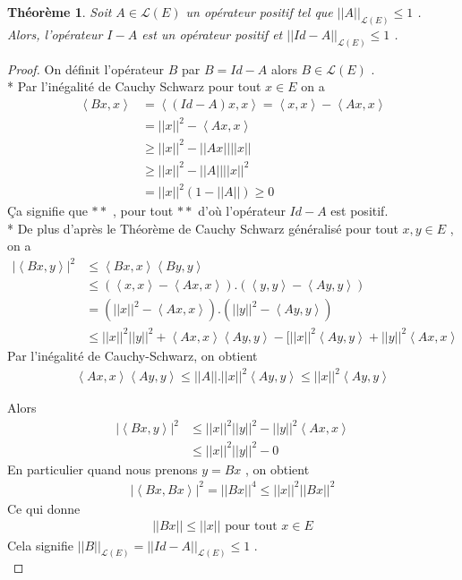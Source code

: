\documentclass{report}
\newtheorem{The}{Théorème}[subsection]
\begin{document}
{\begin{The} Soit $A \in \mathscr{L}(E)$ un opérateur positif tel que $||A||_{\mathscr{L}(E)} \le 1$ . Alors, l'opérateur $I - A$ est un opérateur positif et $||Id - A||_{\mathscr{L}(E)} \le 1$ .\\
\end{The}
\begin{proof}
On définit l'opérateur $B$ par $B = Id - A$ alors $B \in \mathscr{L}(E)$ .\\
* Par l'inégalité de Cauchy Schwarz pour tout $x \in E$ on a 
					\begin{align*}
					 \left< Bx,x \right> &= \left< (Id-A)x,x \right> = \left< x,x \right> - \left< Ax,x \right> \\
					 &= ||x||^2 - \left< Ax,x \right> \\
					 &\ge ||x||^2 - ||Ax|| ||x|| \\
					 &\ge ||x||^2 - ||A|| ||x||^2 \\
					 &= ||x||^2 (1 - ||A||) \ge 0 
					\end{align*}
Ça signifie que $**$ , pour tout $**$ d'où l'opérateur $Id - A$ est positif.\\
* De plus d'après le Théorème de Cauchy Schwarz généralisé pour tout $x, y \in E$ , on a 
					\begin{align*}
					 |\left< Bx,y \right>|^2 &\le \left< Bx,x \right>\left< By,y \right> \\
					 &\le (\left< x,x \right> - \left< Ax,x \right>).(\left< y,y \right> - \left< Ay,y \right>) \\
					 &= (||x||^2 - \left< Ax,x \right>).(||y||^2 - \left< Ay,y \right>) \\
					 &\le ||x||^2 ||y||^2 + \left< Ax,x \right>\left< Ay,y \right> - [||x||^2 \left< Ay, y \right> + ||y||^2 \left< Ax,x \right> 
					\end{align*}
Par l'inégalité de Cauchy-Schwarz, on obtient 
					\begin{align*}
					 \left< Ax,x \right> \left< Ay,y \right> \le ||A||.||x||^2 \left< Ay,y \right> \le ||x||^2 \left< Ay,y \right> 
					\end{align*}



 Alors 
 					\begin{align*}
					 |\left< Bx,y \right>|^2 &\le ||x||^2 ||y||^2 - ||y||^2 \left< Ax,x \right> \\
					 &\le ||x||^2 ||y||^2 - 0 
					\end{align*}
En particulier quand nous  prenons $y = B x$ , on obtient 
					\begin{align*}
					 | \left< Bx,Bx \right>|^2 = ||Bx||^4 \le ||x||^2 ||Bx||^2 
					\end{align*}
Ce qui donne 
					\begin{align*}
					 ||Bx|| \le ||x|| \,\,\text{pour tout}\,\, x \in E 
					\end{align*}
Cela signifie $||B||_{\mathscr{L}(E)} = ||Id - A||_{\mathscr{L}(E)} \le 1$ .\\
\end{proof}


}
\end{document}
